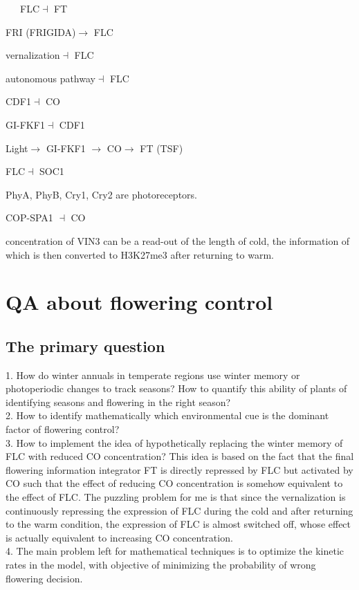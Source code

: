 \documentclass[paper=a4, fontsize=12pt]{scrartcl}	%
\numberwithin{equation}{section}					%
\numberwithin{figure}{section}					%
\numberwithin{table}{section}					%
\begin{document}
\ \ \ FLC$\dashv$ FT

FRI (FRIGIDA)$\rightarrow$ FLC

vernalization$\dashv$ FLC

autonomous pathway$\dashv$ FLC

CDF1$\dashv$ CO

GI-FKF1$\dashv$ CDF1

Light$\to$ GI-FKF1 $\to$ CO$\to$ FT (TSF)

FLC$\dashv$ SOC1

PhyA, PhyB, Cry1, Cry2 are photoreceptors.

COP-SPA1 $\dashv$ CO

concentration of VIN3 can be a read-out of the length of cold, the information of which is then converted to H3K27me3 after returning to warm. 


\section{QA about flowering control}

\subsection{The primary question}

1. How do winter annuals in temperate regions use winter memory or photoperiodic changes to track seasons? How to quantify this ability of plants of identifying seasons and flowering in the right season?\\

2. How to identify mathematically which environmental cue is the dominant factor of flowering control?\\

3. How to implement the idea of hypothetically replacing the winter memory of FLC with reduced CO concentration? This idea is based on the fact that the final flowering information integrator FT is directly repressed by FLC but activated by CO such that the effect of reducing CO concentration is somehow equivalent to the effect of FLC. The puzzling problem for me is that since the vernalization is continuously repressing the expression of FLC during the cold and after returning to the warm condition, the expression of FLC is almost switched off, whose effect is actually equivalent to increasing CO concentration. \\

4. The main problem left for mathematical techniques is to optimize the kinetic rates in the model, with objective of minimizing the probability of wrong flowering decision. \\ 
\end{document}
